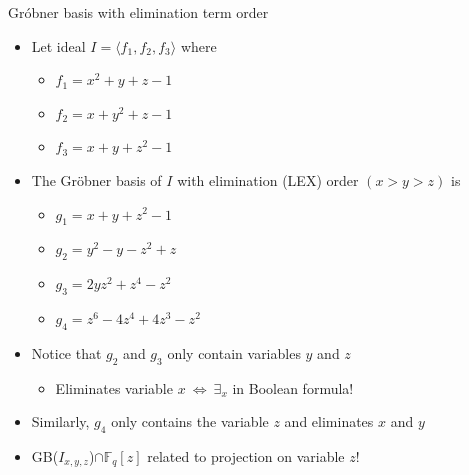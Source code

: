 \documentclass[xcolor=dvipsnames]{beamer}
\newcommand{\Fq}{{\mathbb{F}}_{q}}
\newcommand{\Grobner}{Gr\"{o}bner\xspace}
\begin{document}
\begin{frame}{\large{Gr\'obner basis with elimination term order}}
\begin{itemize}
\item Let ideal $I = \langle f_1, f_2, f_3 \rangle$ where
	\begin{itemize}
	\item $f_1 = x^2 + y + z - 1$
	\item $f_2 = x + y^2 + z - 1$
	\item $f_3 = x + y + z^2 - 1$
	\end{itemize}
\item The \Grobner basis of $I$ with \alert{elimination} (LEX) order $(x > y > z)$ is
	\begin{itemize}
	\item $g_1 = x + y + z^2 - 1$
	\item $g_2 = y^2 - y - z^2 + z$
	\item $g_3 = 2yz^2 + z^4 - z^2$
	\item $g_4 = z^6 - 4z^4 + 4z^3 - z^2$
	\end{itemize}
\item Notice that $g_2$ and $g_3$ only contain variables $y$ and $z$
	\begin{itemize}
	\item Eliminates variable $x~\Leftrightarrow  ~\exists_x$ in Boolean formula!
	\end{itemize}
\item Similarly, $g_4$ only contains the variable $z$ and eliminates $x$ and $y$
\pause
\item GB($I_{x,y,z}$)$\cap\Fq[z]$ related to \alert{projection} on variable $z$!
\end{itemize}
\end{frame}
\end{document}

